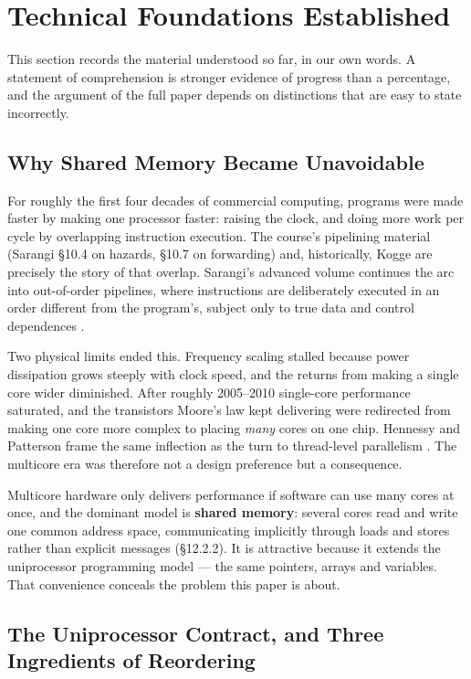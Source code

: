 \section{Technical Foundations Established}
\label{sec:technical}

This section records the material understood so far, in our own words.
A statement of comprehension is stronger evidence of progress than a
percentage, and the argument of the full paper depends on distinctions that are
easy to state incorrectly.

\subsection{Why Shared Memory Became Unavoidable}

For roughly the first four decades of commercial computing, programs were made
faster by making one processor faster: raising the clock, and doing more work
per cycle by overlapping instruction execution.
The course's pipelining material (Sarangi \S10.4 on hazards, \S10.7 on
forwarding) and, historically, Kogge \cite{kogge1981pipelined} are precisely the
story of that overlap.
Sarangi's advanced volume continues the arc into out-of-order pipelines, where
instructions are deliberately executed in an order different from the
program's, subject only to true data and control dependences
\cite{sarangi2023nextgen}.

Two physical limits ended this.
Frequency scaling stalled because power dissipation grows steeply with clock
speed, and the returns from making a single core wider diminished.
After roughly 2005--2010 single-core performance saturated, and the transistors
Moore's law kept delivering were redirected from making one core more complex to
placing \emph{many} cores on one chip.
Hennessy and Patterson frame the same inflection as the turn to thread-level
parallelism \cite{hennessy2019quantitative}.
The multicore era was therefore not a design preference but a consequence.

Multicore hardware only delivers performance if software can use many cores at
once, and the dominant model is \textbf{shared memory}: several cores read and
write one common address space, communicating implicitly through loads and
stores rather than explicit messages (\S12.2.2).
It is attractive because it extends the uniprocessor programming model --- the
same pointers, arrays and variables.
That convenience conceals the problem this paper is about.

\subsection{The Uniprocessor Contract, and Three Ingredients of Reordering}

